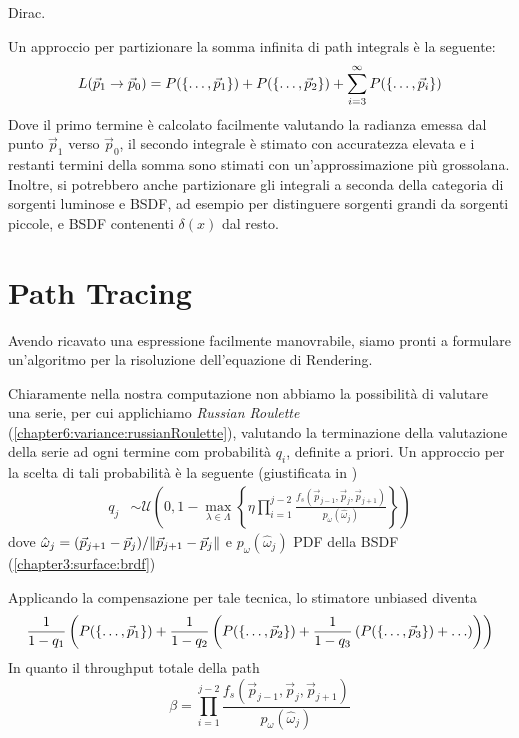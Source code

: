 Dirac.\par
Un approccio per partizionare la somma infinita di path integrals \`e la seguente:
\begin{equation}
	L(\vec{p}_1\to\vec{p}_0)=P(\{\ldots,\vec{p}_{1}\})+P(\{\ldots,\vec{p}_{2}\})+\sum_{i=3}^\infty P(\{\ldots,\vec{p}_{i}\})
\end{equation}
Dove il primo termine \`e calcolato facilmente valutando la radianza emessa dal punto $\vec{p}_1$ verso $\vec{p}_0$, il secondo integrale \`e stimato 
con accuratezza elevata e i restanti termini della somma sono stimati con un'approssimazione pi\`u grossolana. Inoltre, si potrebbero anche partizionare
gli integrali a seconda della categoria di sorgenti luminose e BSDF, ad esempio per distinguere sorgenti grandi da sorgenti piccole, e BSDF contenenti
$\delta(x)$ dal resto.
\section{Path Tracing}
Avendo ricavato una espressione facilmente manovrabile, siamo pronti a formulare un'algoritmo per la risoluzione dell'equazione di Rendering.\par
Chiaramente nella nostra computazione non abbiamo la possibilit\`a di valutare una serie, per cui applichiamo \textit{Russian Roulette} 
(\ref{chapter6:variance:russianRoulette}), valutando la terminazione della valutazione della serie ad ogni termine com probabilit\`a $q_i$, definite 
a priori. Un approccio per la scelta di tali probabilit\`a \`e la seguente (giustificata in \cite{pharr})
\begin{align}
	q_j&\sim\mathcal{U}\left(0,1-\max_{\lambda\in\Lambda}\left\{
		\eta\prod_{i=1}^{j-2}\frac{f_s(\vec{p}_{j-1},\vec{p}_j,\vec{p}_{j+1})}{p_\omega(\hat{\omega}_j)}\right\}\right)
\end{align}
dove $\hat{\omega}_j=(\vec{p}_{j+1}-\vec{p}_j)/\norm{\vec{p}_{j+1}-\vec{p}_j}$ e $p_\omega(\hat{\omega}_j)$ PDF della BSDF 
(\ref{chapter3:surface:brdf})\par
Applicando la compensazione per tale tecnica, lo stimatore unbiased diventa
\begin{equation}\label{chapter8:pt:russianroulette}
	\frac{1}{1-q_1}\left(P(\{\ldots,\vec{p}_{1}\})+\frac{1}{1-q_2}\left(P(\{\ldots,\vec{p}_{2}\})+\frac{1}{1-q_3}\left(P(\{\ldots,\vec{p}_{3}\})+\ldots\right)\right)\right)
\end{equation}
In quanto il throughput totale della path
\begin{equation*}
	\beta=\prod_{i=1}^{j-2}\frac{f_s(\vec{p}_{j-1},\vec{p}_j,\vec{p}_{j+1})}{p_\omega(\hat{\omega}_j)}
\end{equation*}
